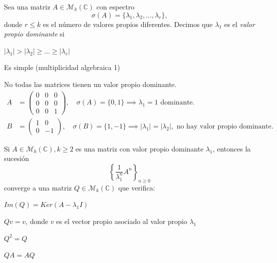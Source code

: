 \begin{ndef}
    Sea una matriz $A \in \mathcal M_k (\mathbb C)$ con espectro
    $$ \sigma(A) = \{ \lambda_1, \lambda_2, \hdots, \lambda_r \},$$
    donde $r \leq k$ es el número de valores propios diferentes.
    Decimos que $\lambda_1$ es el \textit{valor propio dominante} si
    \begin{nlist}
        \item $|\lambda_1| > |\lambda_2| \geq \dots \geq |\lambda_r|$
        \item Es simple (multiplicidad algebraica 1)
    \end{nlist}
\end{ndef}

\begin{ejemplo} No todas las matrices tienen un valor propio dominante.
    \begin{align*}
        \label{}
        A &= \begin{pmatrix}
            0 & 0 & 0 \\
            0 & 0 & 0 \\
            0 & 0 & 1
        \end{pmatrix}, \quad \sigma(A) = \{0, 1 \} \implies \lambda_1 = 1 \text{ dominante.} \\
        B &= \begin{pmatrix}
            1 & 0 \\
            0 & -1
        \end{pmatrix}, \quad \sigma(B) = \{ 1, -1 \} \implies |\lambda_1| = |\lambda_2|, \text{ no hay valor propio dominante.}
    \end{align*}
\end{ejemplo}

\begin{nth}
    Si $A \in \mathcal M_k (\mathbb C), k\ge 2$ es una matriz con valor propio dominante $\lambda_1$, entonces la sucesión $$ \left\{ \frac{1}{\lambda_1^n}A^n \right\}_{n \geq 0}$$ converge a una matriz $Q \in \mathcal M_k (\mathbb C)$ que verifica:
    \begin{nlist}
        \item $Im(Q) = Ker(A - \lambda_1I)$
        \item $Qv = v$, donde $v$ es el vector propio asociado al valor propio $\lambda_1$
        \item $Q^2 = Q$
        \item $QA = AQ$
    \end{nlist}
\end{nth}

